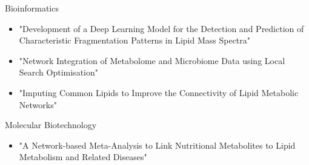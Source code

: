 \datedsubsection{}
{%
}
{%
	Bioinformatics
}
{%
	\begin{itemize}
		\item "Development of a Deep Learning Model for the Detection and Prediction of Characteristic Fragmentation Patterns in Lipid Mass Spectra"
		\item "Network Integration of Metabolome and Microbiome Data using Local Search Optimisation"
		\item "Imputing Common Lipids to Improve the Connectivity of Lipid Metabolic Networks"
	\end{itemize}
}

\datedsubsection{}
{%
}
{%
	Molecular Biotechnology
}
{%
	\begin{itemize}
		\item "A Network-based Meta-Analysis to Link Nutritional Metabolites to Lipid Metabolism and Related Diseases"
	\end{itemize}
}
